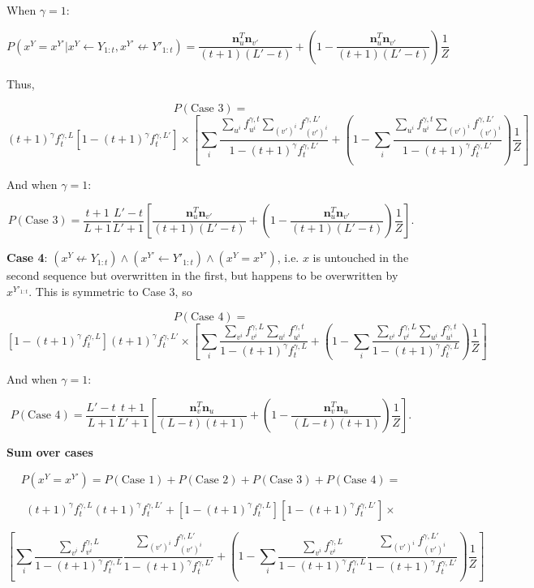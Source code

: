 \documentclass{article}
\begin{document}
\begin{appendices}
When $\gamma = 1$:

$$P(x^Y = x^{Y'}|x^Y \leftarrow Y_{1:t}, x^{Y'} \not\leftarrow Y'_{1:t}) =
\frac{\mathbf{n}^T_{u}\mathbf{n}_{v'}}{(t+1)(L'-t)} + \left(1 - \frac{\mathbf{n}^T_{u}\mathbf{n}_{v'}}{(t+1)(L'-t)} \right)\frac{1}{Z}$$

Thus,

$$P(\textrm{Case 3}) = $$
$$(t+1)^\gamma f^{\gamma,L}_t[1-(t+1)^\gamma f^{\gamma,L'}_t] \times 
\left[
\sum_i \frac{\sum\limits_{u^i} f_{u^i}^{\gamma, t} \sum\limits_{(v')^i} f_{(v')^i}^{\gamma,L'}}{1 - (t+1)^\gamma f^{\gamma,L'}_t} 
+ \left(1 - \sum_i \frac{\sum\limits_{u^i} f_{u^i}^{\gamma, t} \sum\limits_{(v')^i} f_{(v')^i}^{\gamma,L'}}{1 - (t+1)^\gamma f^{\gamma,L'}_t}\right)\frac{1}{Z}
\right]$$

And when $\gamma = 1$:

$$P(\textrm{Case 3}) = \frac{t+1}{L+1}\frac{L'-t}{L'+1}\left[
\frac{\mathbf{n}^T_{u}\mathbf{n}_{v'}}{(t+1)(L'-t)} + \left(1 - \frac{\mathbf{n}^T_{u}\mathbf{n}_{v'}}{(t+1)(L'-t)} \right)\frac{1}{Z}
\right].$$

\textbf{Case 4}: $(x^Y \not \leftarrow Y_{1:t}) \land (x^{Y'} \leftarrow Y'_{1:t}) \land (x^Y = x^{Y'})$, i.e. $x$ is untouched in the second sequence but overwritten in the first, but happens to be overwritten by $x^{Y'_{1:t}}$. This is symmetric to Case 3, so

$$P(\textrm{Case 4}) = $$
$$[1 - (t+1)^\gamma f^{\gamma,L}_t](t+1)^\gamma f^{\gamma,L'}_t \times \left[
\sum_i \frac{\sum\limits_{v^i} f_{v^i}^{\gamma,L}\sum\limits_{u^i} f_{u^i}^{\gamma, t}}{1 - (t+1)^\gamma f^{\gamma,L}_t} 
+ \left(1 - \sum_i \frac{\sum\limits_{v^i} f_{v^i}^{\gamma,L}\sum\limits_{u^i} f_{u^i}^{\gamma, t}}{1 - (t+1)^\gamma f^{\gamma,L}_t}\right)\frac{1}{Z}
\right]$$

And when $\gamma = 1$:

$$P(\textrm{Case 4}) = \frac{L'-t}{L+1}\frac{t+1}{L'+1}\left[
\frac{\mathbf{n}^T_{v}\mathbf{n}_{u}}{(L-t)(t+1)} + \left(1 - \frac{\mathbf{n}^T_{v}\mathbf{n}_{u}}{(L-t)(t+1)} \right)\frac{1}{Z}
\right].$$

\textbf{Sum over cases}

$$P(x^Y = x^{Y'}) = P(\textrm{Case 1}) + P(\textrm{Case 2}) + P(\textrm{Case 3}) + P(\textrm{Case 4}) = $$

$$
(t+1)^\gamma f^{\gamma,L}_t(t+1)^\gamma f^{\gamma,L'}_t + [1 - (t+1)^\gamma f^{\gamma,L}_t][1 - (t+1)^\gamma f^{\gamma,L'}_t] \times$$

$$\left[
\sum_i \frac{\sum\limits_{v^i} f^{\gamma,L}_{v^i}}{1 - (t+1)^\gamma f^{\gamma,L}_t} \frac{\sum\limits_{(v')^i} f^{\gamma,L'}_{(v')^i}}{1 - (t+1)^\gamma f^{\gamma,L'}_t} + \left(1 - \sum_i \frac{\sum\limits_{v^i} f^{\gamma,L}_{v^i}}{1 - (t+1)^\gamma f^{\gamma,L}_t} \frac{\sum\limits_{(v')^i} f^{\gamma,L'}_{(v')^i}}{1 - (t+1)^\gamma f^{\gamma,L'}_t}\right)\frac{1}{Z}
\right]$$


\end{appendices}
\end{document}
